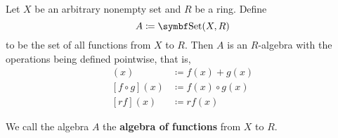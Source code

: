 \begin{definition}\label{thm:functions_over_ring_form_algebra}
  Let \( X \) be an arbitrary nonempty set and \( R \) be a ring. Define
  \begin{equation*}
    A \coloneqq \Bold{Set}(X, R)
  \end{equation*}
  to be the set of all functions from \( X \) to \( R \). Then \( A \) is an \( R \)-algebra with the operations being defined pointwise, that is,
  \begin{align*}
    [f + g](x) &\coloneqq f(x) + g(x) \\
    [f \circ g](x) &\coloneqq f(x) \circ g(x) \\
    [rf](x) &\coloneqq r f(x) 
  \end{align*}

  We call the algebra \( A \) the \textbf{algebra of functions} from \( X \) to \( R \).
\end{definition}
